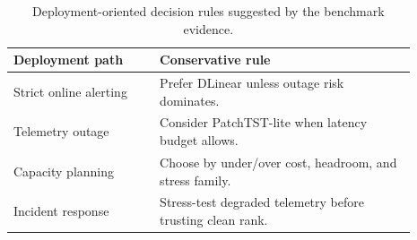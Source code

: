 \begin{table}[t]
\centering
\caption{Deployment-oriented decision rules suggested by the benchmark evidence.}
\label{tab:deployment-decision}
\scriptsize
\setlength{\tabcolsep}{3pt}
\begin{tabular}{p{0.32\linewidth} p{0.57\linewidth}}
\toprule
Deployment path & Conservative rule \\
\midrule
Strict online alerting & Prefer DLinear unless outage risk dominates. \\
Telemetry outage & Consider PatchTST-lite when latency budget allows. \\
Capacity planning & Choose by under/over cost, headroom, and stress family. \\
Incident response & Stress-test degraded telemetry before trusting clean rank. \\
\bottomrule
\end{tabular}
\end{table}
